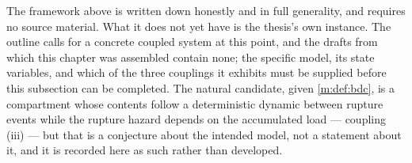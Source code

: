 \begin{remark}
\label{m:rem:coupledstub}
The framework above is written down honestly and in full generality, and requires
no source material. What it does not yet have is the thesis's own instance. The
outline calls for a concrete coupled system at this point, and the drafts from
which this chapter was assembled contain none; the specific model, its state
variables, and which of the three couplings it exhibits must be supplied before
this subsection can be completed. The natural candidate, given
\cref{m:def:bdc}, is a compartment whose contents follow a deterministic dynamic
between rupture events while the rupture hazard depends on the accumulated load
--- coupling (iii) --- but that is a conjecture about the intended model, not a
statement about it, and it is recorded here as such rather than developed.
\end{remark}
